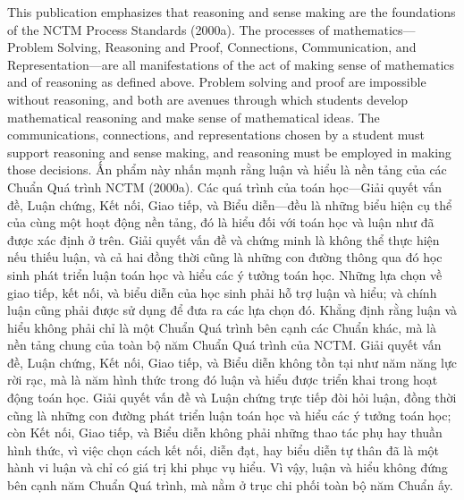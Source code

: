 \documentclass[
  10pt,
  a4paper,
  landscape,
  twoside,
  openany
]{scrbook}
\newcommand{\EN}[1]{#1}
\newcommand{\VI}[1]{#1}
\newcommand{\NOTE}[1]{#1}
\begin{document}
\TriPara
{
\EN{This publication emphasizes that reasoning and sense making are the foundations of the NCTM Process Standards (2000a). The processes of mathematics---Problem Solving, Reasoning and Proof, Connections, Communication, and Representation---are all manifestations of the act of making sense of mathematics and of reasoning as defined above. Problem solving and proof are impossible without reasoning, and both are avenues through which students develop mathematical reasoning and make sense of mathematical ideas. The communications, connections, and representations chosen by a student must support reasoning and sense making, and reasoning must be employed in making those decisions.}
}
{
\VI{Ấn phẩm này nhấn mạnh rằng luận và hiểu là nền tảng của các Chuẩn Quá trình NCTM (2000a). Các quá trình của toán học---Giải quyết vấn đề, Luận chứng, Kết nối, Giao tiếp, và Biểu diễn---đều là những biểu hiện cụ thể của cùng một hoạt động nền tảng, đó là hiểu đối với toán học và luận như đã được xác định ở trên. Giải quyết vấn đề và chứng minh là không thể thực hiện nếu thiếu luận, và cả hai đồng thời cũng là những con đường thông qua đó học sinh phát triển luận toán học và hiểu các ý tưởng toán học. Những lựa chọn về giao tiếp, kết nối, và biểu diễn của học sinh phải hỗ trợ luận và hiểu; và chính luận cũng phải được sử dụng để đưa ra các lựa chọn đó.}
}
{
\NOTE{Khẳng định rằng luận và hiểu không phải chỉ là một Chuẩn Quá trình bên cạnh các Chuẩn khác, mà là nền tảng chung của toàn bộ năm Chuẩn Quá trình của NCTM. Giải quyết vấn đề, Luận chứng, Kết nối, Giao tiếp, và Biểu diễn không tồn tại như năm năng lực rời rạc, mà là năm hình thức trong đó luận và hiểu được triển khai trong hoạt động toán học. Giải quyết vấn đề và Luận chứng trực tiếp đòi hỏi luận, đồng thời cũng là những con đường phát triển luận toán học và hiểu các ý tưởng toán học; còn Kết nối, Giao tiếp, và Biểu diễn không phải những thao tác phụ hay thuần hình thức, vì việc chọn cách kết nối, diễn đạt, hay biểu diễn tự thân đã là một hành vi luận và chỉ có giá trị khi phục vụ hiểu. Vì vậy, luận và hiểu không đứng bên cạnh năm Chuẩn Quá trình, mà nằm ở trục chi phối toàn bộ năm Chuẩn ấy.}
}
\end{document}
